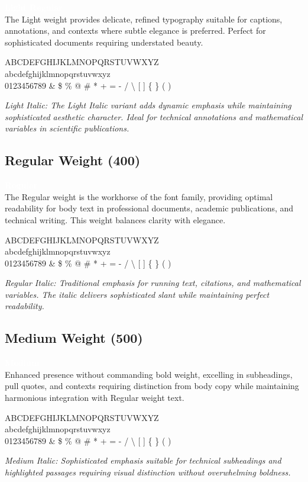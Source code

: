 \documentclass[11pt,letterpaper]{article}
\newcommand{\showcaseweight}[2]{%
    \noindent\colorbox{spacetimeblack}{\textcolor{white}{\textbf{#1}}}\\[2pt]
    #2
}
\begin{document}
{\lightfont
\showcaseweight{Light Regular}{
The Light weight provides delicate, refined typography suitable for captions, annotations, and contexts where subtle elegance is preferred. Perfect for sophisticated documents requiring understated beauty.

ABCDEFGHIJKLMNOPQRSTUVWXYZ\\
abcdefghijklmnopqrstuvwxyz\\
0123456789 \& \$ \% @ \# * + = - / \textbackslash{} [ ] \{ \} ( )
}

\textit{Light Italic: The Light Italic variant adds dynamic emphasis while maintaining sophisticated aesthetic character. Ideal for technical annotations and mathematical variables in scientific publications.}
}

\subsection{Regular Weight (400)}

\showcaseweight{Regular}{
The Regular weight is the workhorse of the font family, providing optimal readability for body text in professional documents, academic publications, and technical writing. This weight balances clarity with elegance.

ABCDEFGHIJKLMNOPQRSTUVWXYZ\\
abcdefghijklmnopqrstuvwxyz\\
0123456789 \& \$ \% @ \# * + = - / \textbackslash{} [ ] \{ \} ( )
}

\textit{Regular Italic: Traditional emphasis for running text, citations, and mathematical variables. The italic delivers sophisticated slant while maintaining perfect readability.}

\subsection{Medium Weight (500)}

{\mediumfont
\showcaseweight{Medium}{
Enhanced presence without commanding bold weight, excelling in subheadings, pull quotes, and contexts requiring distinction from body copy while maintaining harmonious integration with Regular weight text.

ABCDEFGHIJKLMNOPQRSTUVWXYZ\\
abcdefghijklmnopqrstuvwxyz\\
0123456789 \& \$ \% @ \# * + = - / \textbackslash{} [ ] \{ \} ( )
}

\textit{Medium Italic: Sophisticated emphasis suitable for technical subheadings and highlighted passages requiring visual distinction without overwhelming boldness.}
}
\end{document}
